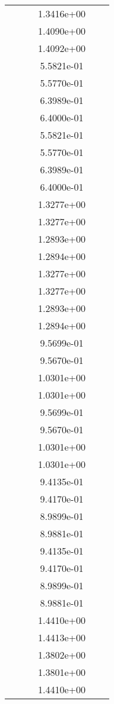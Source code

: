 \begin{xltabular}{\textwidth}{r|rS[table-format=1.3e+2]S[table-format=1.4e+2]S[table-format=1.4e+2]S[table-format=-1.5]}
&  &  & 1.3416e+00 & & \\
&  &  & 1.4090e+00 & & \\
&  &  & 1.4092e+00 & & \\
&  &  & 5.5821e-01 & & \\
&  &  & 5.5770e-01 & & \\
&  &  & 6.3989e-01 & & \\
&  &  & 6.4000e-01 & & \\
&  &  & 5.5821e-01 & & \\
&  &  & 5.5770e-01 & & \\
&  &  & 6.3989e-01 & & \\
&  &  & 6.4000e-01 & & \\
&  &  & 1.3277e+00 & & \\
&  &  & 1.3277e+00 & & \\
&  &  & 1.2893e+00 & & \\
&  &  & 1.2894e+00 & & \\
&  &  & 1.3277e+00 & & \\
&  &  & 1.3277e+00 & & \\
&  &  & 1.2893e+00 & & \\
&  &  & 1.2894e+00 & & \\
&  &  & 9.5699e-01 & & \\
&  &  & 9.5670e-01 & & \\
&  &  & 1.0301e+00 & & \\
&  &  & 1.0301e+00 & & \\
&  &  & 9.5699e-01 & & \\
&  &  & 9.5670e-01 & & \\
&  &  & 1.0301e+00 & & \\
&  &  & 1.0301e+00 & & \\
&  &  & 9.4135e-01 & & \\
&  &  & 9.4170e-01 & & \\
&  &  & 8.9899e-01 & & \\
&  &  & 8.9881e-01 & & \\
&  &  & 9.4135e-01 & & \\
&  &  & 9.4170e-01 & & \\
&  &  & 8.9899e-01 & & \\
&  &  & 8.9881e-01 & & \\
&  &  & 1.4410e+00 & & \\
&  &  & 1.4413e+00 & & \\
&  &  & 1.3802e+00 & & \\
&  &  & 1.3801e+00 & & \\
&  &  & 1.4410e+00 & & \\

\end{xltabular}
